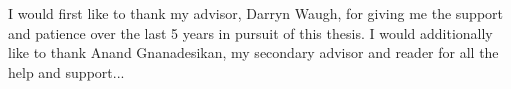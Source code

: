 \begin{acknowledgements}

I would first like to thank my advisor, Darryn Waugh, for giving me the support
and patience over the last 5 years in pursuit of this thesis. I would additionally
like to thank Anand Gnanadesikan, my secondary advisor and reader for all the
help and support...




\end{acknowledgements}




